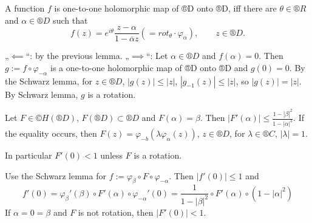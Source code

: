 \documentclass[12pt]{article}					%
\begin{document}
\begin{veta}
	A function $f$ is one-to-one holomorphic map of ®D onto ®D, iff there are $θ \in ®R$ and $α \in ®D$ such that
	$$ f(z) = e^{iθ}\frac{z - α}{1 - \overline{α}z} (= rot_θ · φ_α), \qquad z \in ®D. $$

	\begin{dukazin}
		„$\impliedby$“: by the previous lemma. „$\implies$“: Let $α \in ®D$ and $f(α) = 0$. Then $g := f \circ φ_{-α}$ is a one-to-one holomorphic map of ®D onto ®D and $g(0) = 0$. By the Schwarz lemma, for $z \in ®D$, $|g(z)| ≤ |z|$, $|g_{-1}(z)| ≤ |z|$, so $|g(z)| = |z|$. By Schwarz lemma, $g$ is a rotation.
	\end{dukazin}
\end{veta}

\begin{lemma}
	Let $F \in ©H(®D)$, $F(®D) \subset ®D$ and $F(α) = β$. Then $|F'(α)| ≤ \frac{1 - |β|^2}{1 - |α|^2}$. If the equality occurs, then $F(z) = φ_{-b}(λ φ_α(z))$, $z \in ®D$, for $λ \in ®C$, $|λ| = 1$.

	In particular $F'(0) < 1$ unless $F$ is a rotation.

	\begin{dukazin}
		Use the Schwarz lemma for $f := φ_β ∘ F ∘ φ_{-α}$. Then $|f'(0)| ≤ 1$ and
		$$ f'(0) = φ_β'(β)∘F'(α)∘φ_{-α}'(0) = \frac{1}{1 - |β|^2} ∘ F'(α) ∘ (1 - |α|^2) $$
		If $α = 0 = β$ and $F$ is not rotation, then $|F'(0)| < 1$.
	\end{dukazin}
\end{lemma}
\end{document}
